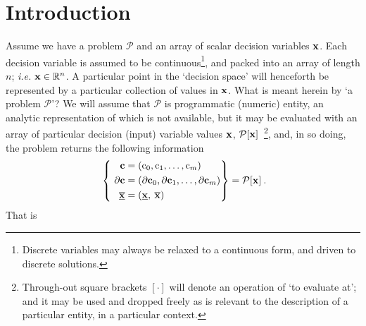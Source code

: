 \documentclass[11pt]{article}
\begin{document}

\section{Introduction}
Assume we have a problem $\mathcal{P}$ and an array of scalar decision variables $\mathbf{x}$. Each decision variable is assumed to be continuous\footnote{Discrete variables may always be relaxed to a continuous form, and driven to discrete solutions.}, and packed into an array of length $n$; \emph{i.e.} $\mathbf{x} \in \mathbb{R}^n$. A particular point in the `decision space' will henceforth be represented by a particular collection of values in $\mathbf{x}$. What is meant herein by `a problem $\mathcal{P}$'? We will assume that $\mathcal{P}$ is programmatic (numeric) entity, an analytic representation of which is not available, but it may be evaluated with an array of particular decision (input) variable values $\mathbf{x}$, $\mathcal{P}[\mathbf{x}]$~\footnote{Through-out square brackets $[\cdot]$ will denote an operation of `to evaluate at'; and it may be used and dropped freely as is relevant to the description of a particular entity, in a particular context.}, and, in so doing, the problem returns the following information
\begin{align}
\label{d:eqn:p}
 ~\left\{ ~
\begin{aligned}
\mathbf{c} &= (\textrm{c}_0, \textrm{c}_1, \ldots, \textrm{c}_m ) \\
\mathbf{\partial c} & = (\mathbf{\partial c}_0 , \mathbf{\partial c}_1 , \ldots,\mathbf{\partial c}_m  ) \\ \underline{\overline{\mathbf{x}}} & = ( \underline{\mathbf{x}} , \: \overline{\mathbf{x}} ) \:
\end{aligned}\right\} =
\mathcal{P} [\mathbf{x}] \: .
\end{align}
That is 
\end{document}
